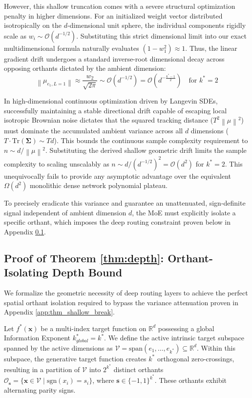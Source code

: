 \documentclass{article}
\newcommand{\R}{\mathbb{R}}
\newcommand{\1}{\mathbb{I}}
\newcommand{\norm}[1]{\left\lVert#1\right\rVert}
\newcommand{\calO}{\mathcal{O}}
\newcommand{\bx}{\mathbf{x}}
\newcommand{\bSigma}{\boldsymbol{\Sigma}}
\newcommand{\spn}{\mathrm{span}}
\newcommand{\sgn}{\mathrm{sgn}}
\newcommand{\Tr}{\mathrm{Tr}}
\begin{document}
However, this shallow truncation comes with a severe structural optimization penalty in higher dimensions. For an initialized weight vector distributed isotropically on the $d$-dimensional unit sphere, the individual components rigidly scale as $w_i \sim \calO(d^{-1/2})$. Substituting this strict dimensional limit into our exact multidimensional formula naturally evaluates $(1 - w_1^2) \approx 1$. Thus, the linear gradient drift undergoes a standard inverse-root dimensional decay across opposing orthants dictated by the ambient dimension:
\begin{equation}
    \norm{\mu_{e_1, L=1}} \approx \frac{w_2}{\sqrt{2\pi}} \sim \calO(d^{-1/2}) = \calO\left(d^{-\frac{k^*-1}{2}}\right) \quad \text{for } k^*=2
\end{equation}

In high-dimensional continuous optimization driven by Langevin SDEs, successfully maintaining a stable directional drift capable of escaping local isotropic Brownian noise dictates that the squared tracking distance ($T^2\norm{\mu}^2$) must dominate the accumulated ambient variance across all $d$ dimensions ($T \cdot \Tr(\bSigma) \sim Td$). This bounds the continuous sample complexity requirement to $n \sim d/\norm{\mu}^2$. 
Substituting the derived shallow geometric drift limits the sample complexity to scaling unscalably as $n \sim d / (d^{-1/2})^2 = \calO(d^2)$ for $k^*=2$. This unequivocally fails to provide any asymptotic advantage over the equivalent $\Omega(d^2)$ monolithic dense network polynomial plateau.

To precisely eradicate this variance and guarantee an unattenuated, sign-definite signal independent of ambient dimension $d$, the MoE must explicitly isolate a specific orthant, which imposes the deep routing constraint proven below in Appendix \ref{app:thm_depth}.

\subsection{Proof of Theorem \ref{thm:depth}: Orthant-Isolating Depth Bound}
\label{app:thm_depth}

We formalize the geometric necessity of deep routing layers to achieve the perfect spatial orthant isolation required to bypass the variance attenuation proven in Appendix \ref{app:thm_shallow_break}. 

Let $f^*(\bx)$ be a multi-index target function on $\R^d$ possessing a global Information Exponent $k_{global}^* = k^*$. We define the active intrinsic target subspace spanned by the active dimensions as $\mathcal{V} = \spn(e_1, \dots, e_{k^*}) \subseteq \R^d$. Within this subspace, the generative target function creates $k^*$ orthogonal zero-crossings, resulting in a partition of $\mathcal{V}$ into $2^{k^*}$ distinct orthants $\mathcal{O}_{\boldsymbol{s}} = \{ \bx \in \mathcal{V} \mid \sgn(x_i) = s_i \}$, where $\boldsymbol{s} \in \{-1, 1\}^{k^*}$. These orthants exhibit alternating parity signs. 
\end{document}
